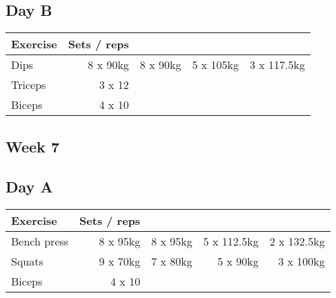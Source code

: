 \documentclass[12pt, a4paper]{article}%
\begin{document}
  \subsection*{\hspace{0.5em} Day B }


  \begin{tabular}{l|rrrr}
  \hspace{0.75em} \textbf{Exercise} & \textbf{Sets / reps} \\ \hline

            \hspace{0.75em} Dips
            & 8 x 90kg
            & 8 x 90kg
            & 5 x 105kg
            & 3 x 117.5kg
            \\


   \hspace{0.75em} Triceps & 3 x 12 \\
   \hspace{0.75em} Biceps & 4 x 10 \\
  \end{tabular}

 \subsection*{\hspace{0.25em} Week 7 }
  \subsection*{\hspace{0.5em} Day A }


  \begin{tabular}{l|rrrr}
  \hspace{0.75em} \textbf{Exercise} & \textbf{Sets / reps} \\ \hline

            \hspace{0.75em} Bench press
            & 8 x 95kg
            & 8 x 95kg
            & 5 x 112.5kg
            & 2 x 132.5kg
            \\


            \hspace{0.75em} Squats
            & 9 x 70kg
            & 7 x 80kg
            & 5 x 90kg
            & 3 x 100kg
            \\


   \hspace{0.75em} Biceps & 4 x 10 \\
  \end{tabular}
\end{document}

